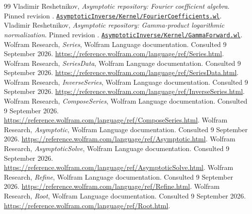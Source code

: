 \begin{thebibliography}{99}
 Vladimir Reshetnikov, \emph{Asymptotic repository: Fourier coefficient algebra}. Pinned revision . \href{https://github.com/VladimirReshetnikov/Asymptotic/blob/921387e5ba1239bfda96e63e64e89bf63d9c41e6/AsymptoticInverse/Kernel/FourierCoefficients.wl}{\nolinkurl{AsymptoticInverse/Kernel/FourierCoefficients.wl}}.
 Vladimir Reshetnikov, \emph{Asymptotic repository: Gamma-product logarithmic normalization}. Pinned revision . \href{https://github.com/VladimirReshetnikov/Asymptotic/blob/921387e5ba1239bfda96e63e64e89bf63d9c41e6/AsymptoticInverse/Kernel/GammaForward.wl}{\nolinkurl{AsymptoticInverse/Kernel/GammaForward.wl}}.
 Wolfram Research, \emph{Series}, Wolfram Language documentation. Consulted 9 September 2026. \url{https://reference.wolfram.com/language/ref/Series.html}.
 Wolfram Research, \emph{SeriesData}, Wolfram Language documentation. Consulted 9 September 2026. \url{https://reference.wolfram.com/language/ref/SeriesData.html}.
 Wolfram Research, \emph{InverseSeries}, Wolfram Language documentation. Consulted 9 September 2026. \url{https://reference.wolfram.com/language/ref/InverseSeries.html}.
 Wolfram Research, \emph{ComposeSeries}, Wolfram Language documentation. Consulted 9 September 2026. \url{https://reference.wolfram.com/language/ref/ComposeSeries.html}.
 Wolfram Research, \emph{Asymptotic}, Wolfram Language documentation. Consulted 9 September 2026. \url{https://reference.wolfram.com/language/ref/Asymptotic.html}.
 Wolfram Research, \emph{AsymptoticSolve}, Wolfram Language documentation. Consulted 9 September 2026. \url{https://reference.wolfram.com/language/ref/AsymptoticSolve.html}.
 Wolfram Research, \emph{Refine}, Wolfram Language documentation. Consulted 9 September 2026. \url{https://reference.wolfram.com/language/ref/Refine.html}.
 Wolfram Research, \emph{Root}, Wolfram Language documentation. Consulted 9 September 2026. \url{https://reference.wolfram.com/language/ref/Root.html}.
\end{thebibliography}
